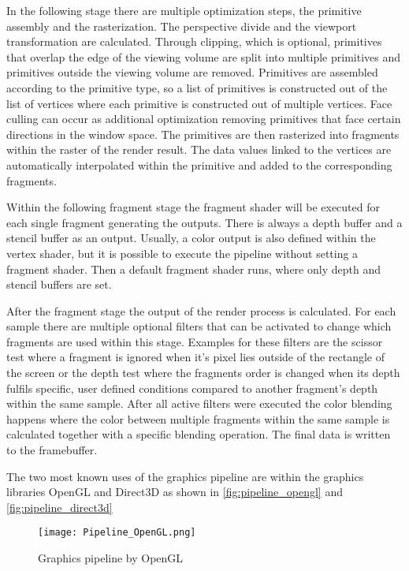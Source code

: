 In the following stage there are multiple optimization steps, the primitive assembly and the rasterization. The perspective divide and the viewport transformation are calculated. Through clipping, which is optional, primitives that overlap the edge of the viewing volume are split into multiple primitives and primitives outside the viewing volume are removed. Primitives are assembled according to the primitive type, so a list of primitives is constructed out of the list of vertices where each primitive is constructed out of multiple vertices. Face culling can occur as additional optimization removing primitives that face certain directions in the window space. The primitives are then rasterized into fragments within the raster of the render result. The data values linked to the vertices are automatically interpolated within the primitive and added to the corresponding fragments.

Within the following fragment stage the fragment shader will be executed for each single fragment generating the outputs. There is always a depth buffer and a stencil buffer as an output. Usually, a color output is also defined within the vertex shader, but it is possible to execute the pipeline without setting a fragment shader. Then a default fragment shader runs, where only depth and stencil buffers are set.

After the fragment stage the output of the render process is calculated. For each sample there are multiple optional filters that can be activated to change which fragments are used within this stage. Examples for these filters are the scissor test where a fragment is ignored when it's pixel lies outside of the rectangle of the screen or the depth test where the fragments order is changed when its depth fulfils specific, user defined conditions compared to another fragment's depth within the same sample. After all active filters were executed the color blending happens where the color between multiple fragments within the same sample is calculated together with a specific blending operation. The final data is written to the framebuffer.

The two most known uses of the graphics pipeline are within the graphics libraries OpenGL and Direct3D as shown in  \autoref{fig:pipeline_opengl} and \autoref{fig:pipeline_direct3d}

\begin{figure}[h!]
  \centering 
  \texttt{[image: Pipeline\_OpenGL.png]}
  \caption[Graphics pipeline by OpenGL ]{Graphics pipeline by OpenGL}
  \label{fig:pipeline_opengl}
\end{figure}

